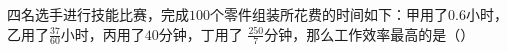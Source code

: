 
四名选手进行技能比赛，完成$100$个零件组装所花费的时间如下：甲用了$0.6$小时，乙用了$\frac{37}{60}$小时，丙用了$40$分钟，丁用了 $\frac{250}{7}$分钟，那么工作效率最高的是（\hspace{4em}）\\
